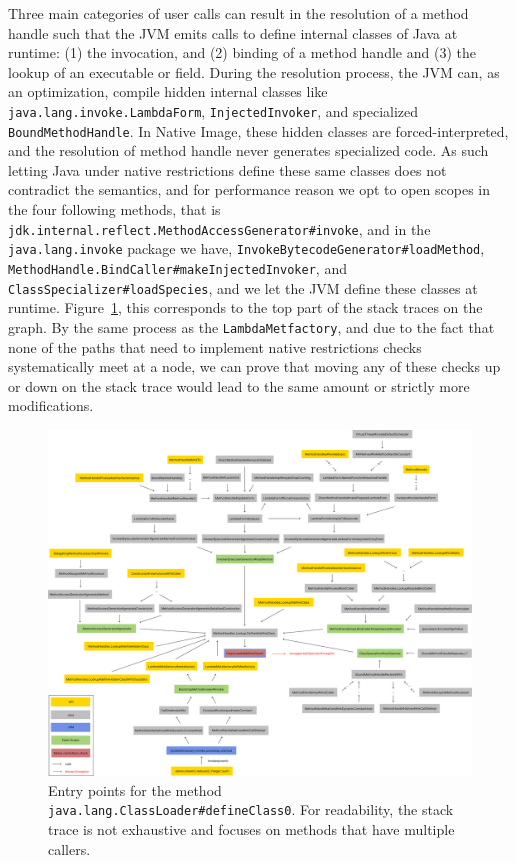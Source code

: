 Three main categories of user calls can result in the resolution of a method handle such that the JVM emits calls to define internal classes of Java at runtime: (1) the invocation, and (2) binding of a method handle and (3) the lookup of an executable or field. During the resolution process, the JVM can, as an optimization, compile hidden internal classes like \verb|java.lang.invoke.LambdaForm|, \verb|InjectedInvoker|, and specialized \verb|BoundMethodHandle|.
In Native Image, these hidden classes are forced-interpreted, and the resolution of method handle never generates specialized code. As such letting Java under native restrictions define these same classes does not contradict the semantics, and for performance reason we opt to open scopes in the four following methods, that is \verb|jdk.internal.reflect.MethodAccessGenerator#invoke|, and in the \verb|java.lang.invoke| package we have, \verb|InvokeBytecodeGenerator#loadMethod|, \verb|MethodHandle.BindCaller#makeInjectedInvoker|, and \verb|ClassSpecializer#loadSpecies|, and we let the JVM define these classes at runtime.
Figure~\ref{fig:define_class_0}, this corresponds to the top part of the stack traces on the graph. By the same process as the \verb|LambdaMetfactory|, and due to the fact that none of the paths that need to implement native restrictions checks systematically meet at a node, we can prove that moving any of these checks up or down on the stack trace would lead to the same amount or strictly more modifications.
\begin{figure}
    \centering
    \includegraphics[angle=90,origin=c,scale=0.35]{resources/Group 409.png}
    \caption{Entry points for the method \texttt{java.lang.ClassLoader\#defineClass0}. For readability, the stack trace is not exhaustive and focuses on methods that have multiple callers.}
    \label{fig:define_class_0}
\end{figure}


